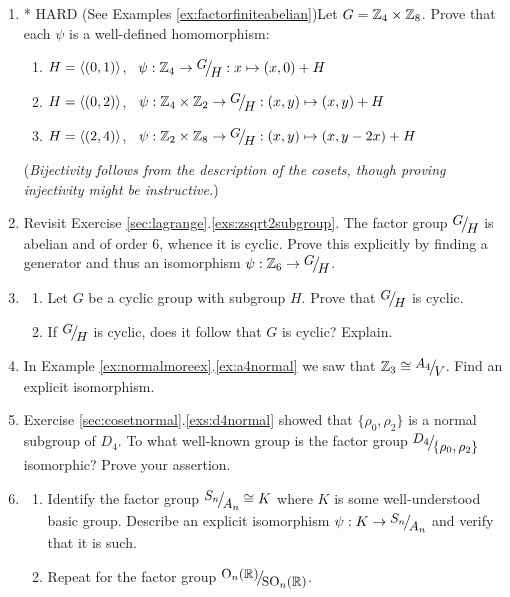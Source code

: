 \begin{exercises}
\begin{enumerate}
	
	 	\item* HARD (See Examples \ref{ex:factorfiniteabelian})\lstsp Let $G=\mathbb{Z}_4\times\mathbb{Z}_8$. Prove that each $\psi$ is a well-defined homomorphism:
		\begin{enumerate}\itemsep0pt
			\item $H=\left\langle (0,1)\right\rangle$, \ $\psi:\Z_4\to\quotient GH:x\mapsto (x,0)+H$
			\item $H=\left\langle (0,2)\right\rangle$, \ $\psi:\Z_4\times\Z_2\to\quotient GH:(x,y)\mapsto (x,y)+H$
			\item $H=\left\langle (2,4)\right\rangle$, \ $\psi:\Z_2\times\Z_8\to\quotient GH:(x,y)\mapsto (x,y-2x)+H$
		\end{enumerate}
		(\emph{Bijectivity follows from the description of the cosets, though proving injectivity might be instructive.})
		
		
		\item Revisit Exercise \ref*{sec:lagrange}.\ref{exs:zsqrt2subgroup}. The factor group $\quotient GH$ is abelian and of order 6, whence it is cyclic. Prove this explicitly by finding a generator and thus an isomorphism $\psi:\Z_6\to\quotient GH$.
		
		
		\item\begin{enumerate}
	  	\item Let $G$ be a cyclic group with subgroup $H$. Prove that $\quotient GH$ is cyclic.
	  	\item If $\quotient GH$ is cyclic, does it follow that $G$ is cyclic? Explain.
		\end{enumerate}
	
	
		\item In Example \ref*{ex:normalmoreex}.\ref{ex:a4normal} we saw that $\Z_3\cong\quotient{A_4}{V}$. Find an explicit isomorphism.
			
	
		\item Exercise \ref*{sec:cosetnormal}.\ref{exs:d4normal} showed that $\{\rho_0,\rho_2\}$ is a normal subgroup of $D_4$. To what well-known group is the factor group $\quotient{D_4}{\{\rho_0,\rho_2\}}$ isomorphic? Prove your assertion.
		
	
		\item\begin{enumerate}
		  \item Identify the factor group $\quotient{S_n}{A_n}\cong K$ where $K$ is some well-understood basic group. Describe an explicit isomorphism $\psi:K\to\quotient{S_n}{A_n}$ and verify that it is such.
		  \item Repeat for the factor group $\quotient{\rO_n(\R)}{\rSO_n(\R)}$.
		\end{enumerate}
		

\end{enumerate}
\end{exercises}
